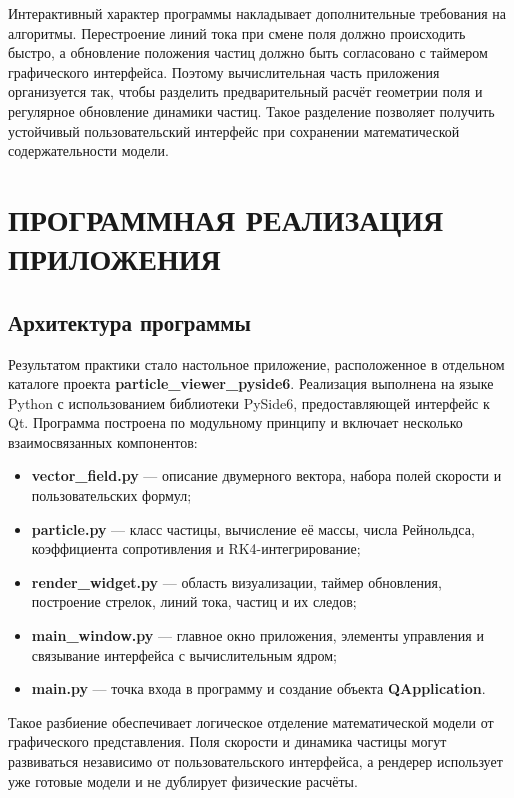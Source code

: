 \documentclass[14pt,a4paper]{extarticle}
\numberwithin{figure}{section}
\numberwithin{table}{section}
\begin{document}
Интерактивный характер программы накладывает дополнительные требования на
алгоритмы. Перестроение линий тока при смене поля должно происходить быстро, а
обновление положения частиц должно быть согласовано с таймером графического
интерфейса. Поэтому вычислительная часть приложения организуется так, чтобы
разделить предварительный расчёт геометрии поля и регулярное обновление динамики
частиц. Такое разделение позволяет получить устойчивый пользовательский интерфейс
при сохранении математической содержательности модели.

\newpage
\section{ПРОГРАММНАЯ РЕАЛИЗАЦИЯ ПРИЛОЖЕНИЯ}

\subsection{Архитектура программы}

Результатом практики стало настольное приложение, расположенное в отдельном
каталоге проекта \textbf{particle\_viewer\_pyside6}. Реализация выполнена на языке
Python с использованием библиотеки PySide6, предоставляющей интерфейс к Qt.
Программа построена по модульному принципу и включает несколько взаимосвязанных
компонентов:
\begin{itemize}
    \item \textbf{vector\_field.py} --- описание двумерного вектора, набора полей скорости и пользовательских формул;
    \item \textbf{particle.py} --- класс частицы, вычисление её массы, числа Рейнольдса, коэффициента сопротивления и RK4-интегрирование;
    \item \textbf{render\_widget.py} --- область визуализации, таймер обновления, построение стрелок, линий тока, частиц и их следов;
    \item \textbf{main\_window.py} --- главное окно приложения, элементы управления и связывание интерфейса с вычислительным ядром;
    \item \textbf{main.py} --- точка входа в программу и создание объекта \textbf{QApplication}.
\end{itemize}

Такое разбиение обеспечивает логическое отделение математической модели от
графического представления. Поля скорости и динамика частицы могут развиваться
независимо от пользовательского интерфейса, а рендерер использует уже готовые
модели и не дублирует физические расчёты.
\end{document}
